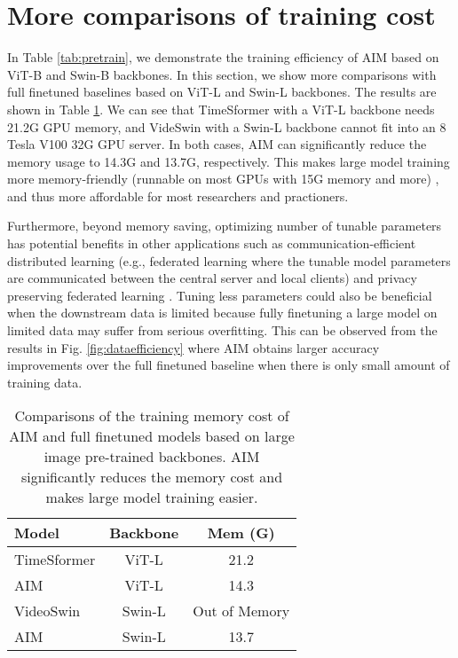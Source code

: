 \documentclass{article} \usepackage{iclr2023_conference,times}
\begin{document}
	\section{More comparisons of training cost}
	In Table \ref{tab:pretrain}, we demonstrate the training efficiency of AIM based on ViT-B and Swin-B backbones. In this section, we show more comparisons with full finetuned baselines based on ViT-L and Swin-L backbones. The results are shown in Table \ref{tab:memorycost}. We can see that TimeSformer with a ViT-L backbone needs 21.2G GPU memory, and VideSwin with a Swin-L backbone cannot fit into an 8 Tesla V100 32G GPU server. In both cases, AIM can significantly reduce the memory usage to 14.3G and 13.7G, respectively. This makes large model training more memory-friendly (runnable on most GPUs with 15G memory and more) , and thus more affordable for most researchers and practioners.
	
	Furthermore, beyond memory saving, optimizing number of tunable parameters has potential benefits in other applications such as communication-efficient distributed learning (e.g., federated learning where the tunable model parameters are communicated between the central server and local clients) and privacy preserving federated learning \cite{fl1, fl2}. Tuning less parameters could also be beneficial when the downstream data is limited because fully finetuning a large model on limited data may suffer from serious overfitting.  This can be observed from the results in Fig. \ref{fig:dataefficiency}  where AIM obtains larger accuracy improvements over the full finetuned baseline when there is only small amount of training data.
	
	
	\begin{table}[t]
		\caption{Comparisons of the training memory cost of AIM and full finetuned models based on large image pre-trained backbones. AIM significantly reduces the memory cost and makes large model training easier.}
		\begin{center}
			\begin{tabular}{l|cc}
				\hline
				Model & Backbone &  Mem (G)   \\
				\hline
				TimeSformer \cite{timesformer} & ViT-L & 21.2 \\
				AIM & ViT-L & 14.3 \\
				\hline
				VideoSwin \cite{liu2022videoswin} & Swin-L & Out of Memory \\
				AIM & Swin-L & 13.7 \\
				\hline
			\end{tabular}
		\end{center}
		\label{tab:memorycost}
	\end{table}
	
\end{document}
